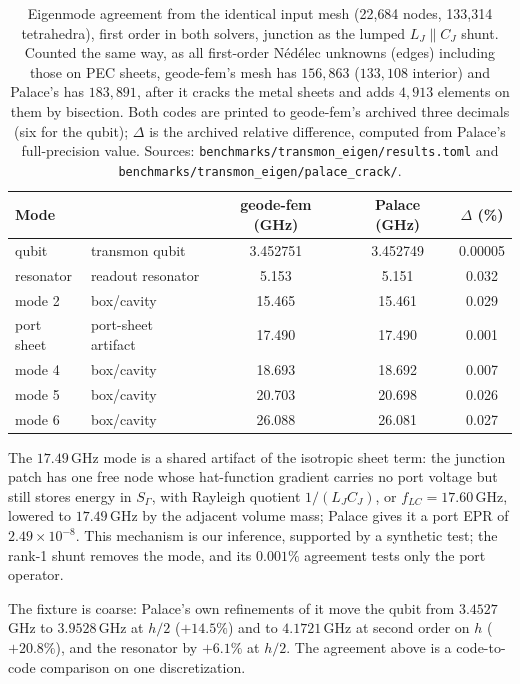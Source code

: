 \documentclass{anvil-paper}
\begin{document}
\begin{table}[htbp]
  \centering
  \caption{Eigenmode agreement from the identical input mesh (22{,}684
  nodes, 133{,}314 tetrahedra), first order in both solvers, junction as
  the lumped $L_J \parallel C_J$ shunt. Counted the same way, as all
  first-order N\'ed\'elec unknowns (edges) including those on PEC sheets,
  geode-fem's mesh has $156{,}863$ ($133{,}108$ interior) and Palace's has
  $183{,}891$, after it cracks the metal sheets and adds $4{,}913$ elements
  on them by bisection. Both
  codes are printed to geode-fem's archived three decimals (six for the
  qubit); $\Delta$ is the archived relative difference, computed from
  Palace's full-precision value. Sources:
  \texttt{benchmarks/transmon\_eigen/results.toml} and
  \texttt{benchmarks/transmon\_eigen/palace\_crack/}.}
  \label{tab:agreement}
  \footnotesize
  \begin{tabular}{@{}llccc@{}}
    \toprule
    Mode & & geode-fem (GHz) & Palace (GHz) & $\Delta$ (\%) \\
    \midrule
    qubit & transmon qubit & 3.452751 & 3.452749 & 0.00005 \\
    resonator & readout resonator & 5.153 & 5.151 & 0.032 \\
    mode 2 & box/cavity & 15.465 & 15.461 & 0.029 \\
    port sheet & port-sheet artifact & 17.490 & 17.490 & 0.001 \\
    mode 4 & box/cavity & 18.693 & 18.692 & 0.007 \\
    mode 5 & box/cavity & 20.703 & 20.698 & 0.026 \\
    mode 6 & box/cavity & 26.088 & 26.081 & 0.027 \\
    \bottomrule
  \end{tabular}
\end{table}

The $17.49$\,GHz mode is a shared artifact of the isotropic sheet term:
the junction patch has one free node whose hat-function gradient carries no
port voltage but still stores energy in $S_\Gamma$, with Rayleigh quotient
$1/(L_JC_J)$, or $f_{LC} = 17.60$\,GHz, lowered to $17.49$\,GHz by the
adjacent volume mass; Palace gives it a port EPR of $2.49\times10^{-8}$.
This mechanism is our inference, supported by a synthetic test; the rank-1
shunt removes the mode, and its $0.001\%$ agreement tests only the port
operator.

The fixture is coarse: Palace's own refinements of it move the qubit from
$3.4527$\,GHz to $3.9528$\,GHz at $h/2$ ($+14.5\%$) and to $4.1721$\,GHz
at second order on $h$ ($+20.8\%$), and the resonator by $+6.1\%$ at
$h/2$. The agreement above is a code-to-code comparison on one discretization.
\end{document}
